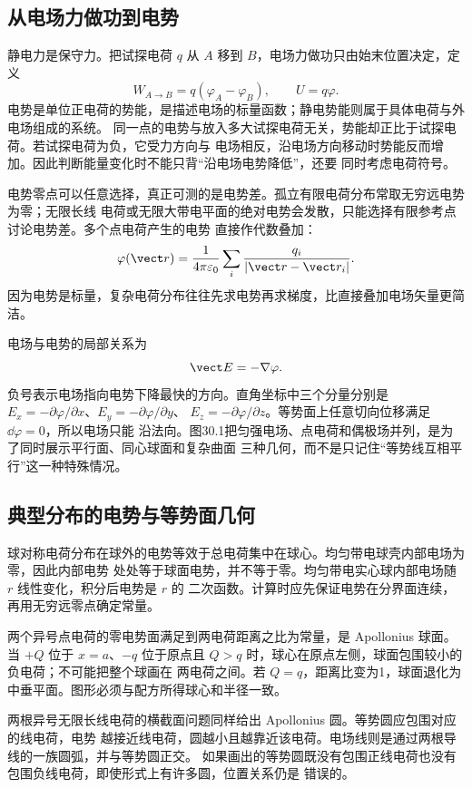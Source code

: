 \subsection*{从电场力做功到电势}

静电力是保守力。把试探电荷 $q$ 从 $A$ 移到 $B$，电场力做功只由始末位置决定，定义
\[
  W_{A\to B}=q(\varphi_A-\varphi_B),
  \qquad U=q\varphi.
\]
电势是单位正电荷的势能，是描述电场的标量函数；静电势能则属于具体电荷与外电场组成的系统。
同一点的电势与放入多大试探电荷无关，势能却正比于试探电荷。若试探电荷为负，它受力方向与
电场相反，沿电场方向移动时势能反而增加。因此判断能量变化时不能只背“沿电场电势降低”，还要
同时考虑电荷符号。

电势零点可以任意选择，真正可测的是电势差。孤立有限电荷分布常取无穷远电势为零；无限长线
电荷或无限大带电平面的绝对电势会发散，只能选择有限参考点讨论电势差。多个点电荷产生的电势
直接作代数叠加：
\[
  \varphi(\vect r)=\frac1{4\pi\varepsilon_0}
  \sum_i\frac{q_i}{|\vect r-\vect r_i|}.
\]
因为电势是标量，复杂电荷分布往往先求电势再求梯度，比直接叠加电场矢量更简洁。

电场与电势的局部关系为
\[
  \vect E=-\nabla\varphi.
\]
负号表示电场指向电势下降最快的方向。直角坐标中三个分量分别是
$E_x=-\partial\varphi/\partial x$、$E_y=-\partial\varphi/\partial y$、
$E_z=-\partial\varphi/\partial z$。等势面上任意切向位移满足 $\dd\varphi=0$，所以电场只能
沿法向。图30.1把匀强电场、点电荷和偶极场并列，是为了同时展示平行面、同心球面和复杂曲面
三种几何，而不是只记住“等势线互相平行”这一种特殊情况。

\subsection*{典型分布的电势与等势面几何}

球对称电荷分布在球外的电势等效于总电荷集中在球心。均匀带电球壳内部电场为零，因此内部电势
处处等于球面电势，并不等于零。均匀带电实心球内部电场随 $r$ 线性变化，积分后电势是 $r$ 的
二次函数。计算时应先保证电势在分界面连续，再用无穷远零点确定常量。

两个异号点电荷的零电势面满足到两电荷距离之比为常量，是 Apollonius 球面。当 $+Q$ 位于
$x=a$、$-q$ 位于原点且 $Q>q$ 时，球心在原点左侧，球面包围较小的负电荷；不可能把整个球画在
两电荷之间。若 $Q=q$，距离比变为1，球面退化为中垂平面。图形必须与配方所得球心和半径一致。

两根异号无限长线电荷的横截面问题同样给出 Apollonius 圆。等势圆应包围对应的线电荷，电势
越接近线电荷，圆越小且越靠近该电荷。电场线则是通过两根导线的一族圆弧，并与等势圆正交。
如果画出的等势圆既没有包围正线电荷也没有包围负线电荷，即使形式上有许多圆，位置关系仍是
错误的。

